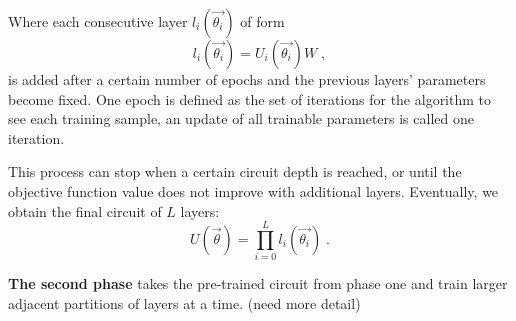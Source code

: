Where each consecutive layer $l_i(\vec{\theta_i})$ of form
\begin{equation}
    l_i(\vec{\theta_i})
    =U_i(\vec{\theta_i}) W \;,
\end{equation}
is added after a certain number of epochs and the previous layers' parameters become fixed. 
One epoch is defined as the set of iterations for the algorithm to see each training sample, an update of all trainable parameters is called one iteration.

This process can stop when a certain circuit depth is reached, or until the objective function value does not improve with additional layers.
Eventually, we obtain the final circuit of $L$ layers:
\begin{equation}
    U(\vec{\theta})
    = \prod_{i=0}^L l_i (\vec{\theta_i}) \;.
\end{equation}

\textbf{The second phase} takes the pre-trained circuit from phase one and train larger adjacent partitions of layers at a time. (need more detail)